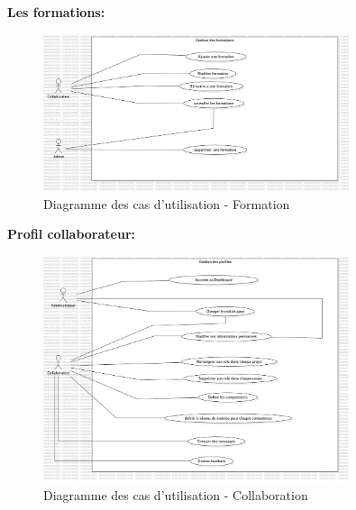 \documentclass{article}
\begin{document}
                \FloatBarrier
                
                \textbf{Les formations:}
                \begin{figure}[h!]
                    \centering
                    \includegraphics[width=0.8\textwidth]{assets/diagrammes/jpg/Model4!UseCaseFormation_3.jpg}
                    \caption{Diagramme des cas d'utilisation - Formation}
                \end{figure}
                
                \FloatBarrier
                \newpage
                \textbf{Profil collaborateur:}
                \begin{figure}[h!]
                    \centering
                    \includegraphics[width=0.8\textwidth]{assets/diagrammes/jpg/Model5!UseCaseCollab_4.jpg}
                    \caption{Diagramme des cas d'utilisation - Collaboration}
                \end{figure}
                \FloatBarrier
                
\end{document}
